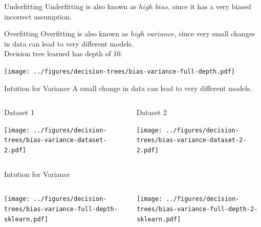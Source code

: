 \documentclass[usenames,dvipsnames]{beamer}
\begin{document}
\begin{frame}{Underfitting}
Underfitting is also known as $high$ $bias$, since it has a very biased incorrect assumption.
\begin{figure}%
\centering
{}%
\qquad
{}%
\label{fig:example}%
\end{figure}
\end{frame}

\begin{frame}{Overfitting}
Overfitting is also known as $high$ $variance$, since very small changes in data can lead to very different models.\\
Decision tree learned has depth of 10.
\begin{center}
\texttt{[image: ../figures/decision-trees/bias-variance-full-depth.pdf]}
\end{center}
\end{frame}


\begin{frame}{Intution for Variance}
A small change in data can lead to very different models.\\
\vspace{1cm}
\begin{columns}
\begin{column}{0.5\textwidth}{\hspace{1.75cm} Dataset 1}
\begin{center}
\texttt{[image: ../figures/decision-trees/bias-variance-dataset-2.pdf]}
\end{center}
\end{column}
\begin{column}{0.5\textwidth}{\hspace{1.75cm} Dataset 2}
\begin{center}
\texttt{[image: ../figures/decision-trees/bias-variance-dataset-2-2.pdf]}
\end{center}
\end{column}
\end{columns}
\end{frame}


\begin{frame}{Intution for Variance}
\begin{columns}
\begin{column}{0.5\textwidth}
\begin{center}
\texttt{[image: ../figures/decision-trees/bias-variance-full-depth-sklearn.pdf]}
\end{center}
\end{column}
\begin{column}{0.5\textwidth}
\begin{center}
\texttt{[image: ../figures/decision-trees/bias-variance-full-depth-2-sklearn.pdf]}
\end{center}
\end{column}
\end{columns}
\end{frame}
\end{document}
